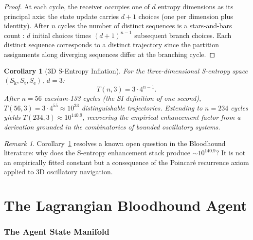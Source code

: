 \documentclass[twocolumn,11pt,a4paper]{article}
\theoremstyle{plain}
\newtheorem{corollary}[theorem]{Corollary}
\theoremstyle{definition}
\theoremstyle{remark}
\newtheorem{remark}[theorem]{Remark}
\newcommand{\Sk}{S_{\mathrm{k}}}
\newcommand{\St}{S_{\mathrm{t}}}
\newcommand{\Se}{S_{\mathrm{e}}}
\begin{document}
\begin{proof}
At each cycle, the receiver occupies one of $d$ entropy dimensions as its principal axis; the state update carries $d+1$ choices (one per dimension plus identity).  After $n$ cycles the number of distinct sequences is a stars-and-bars count \citep{stanley2011,heubach2009}: $d$ initial choices times $(d+1)^{n-1}$ subsequent branch choices.  Each distinct sequence corresponds to a distinct trajectory since the partition assignments along diverging sequences differ at the branching cycle.
\end{proof}

\begin{corollary}[3D S-Entropy Inflation]
\label{cor:3d_inflation}
For the three-dimensional S-entropy space $(\Sk,\St,\Se)$, $d=3$:
\begin{equation}
  T(n,3) = 3\cdot 4^{n-1}.
\end{equation}
After $n = 56$ caesium-133 cycles (the SI definition of one second), $T(56,3) = 3\cdot 4^{55} \approx 10^{33}$ distinguishable trajectories.  Extending to $n = 234$ cycles yields $T(234,3) \approx 10^{140.9}$, recovering the empirical enhancement factor from a derivation grounded in the combinatorics of bounded oscillatory systems.
\end{corollary}

\begin{remark}
Corollary~\ref{cor:3d_inflation} resolves a known open question in the Bloodhound literature: why does the S-entropy enhancement stack produce $\sim 10^{140.9}$?  It is not an empirically fitted constant but a consequence of the Poincar\'e recurrence axiom applied to 3D oscillatory navigation.
\end{remark}

\part{The Lagrangian Bloodhound Agent}

\section{The Agent State Manifold}
\label{sec:manifold}
\end{document}
